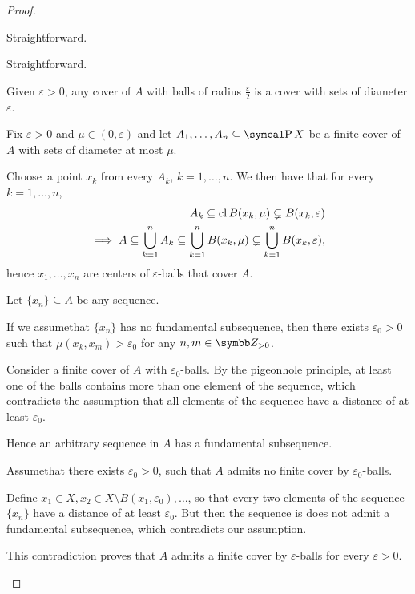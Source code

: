 \begin{proof}
  \begin{description}
     Straightforward.

     Straightforward.

     Given \( \varepsilon > 0 \), any cover of \( A \) with balls of radius \( \frac \varepsilon 2 \) is a cover with sets of diameter \( \varepsilon \).

     Fix \( \varepsilon > 0 \) and \( \mu \in (0, \varepsilon) \) and let \( A_1, \ldots, A_n \subseteq \Power X \) be a finite cover of \( A \) with sets of diameter at most \( \mu \).

    Choose\AOC~a point \( x_k \) from every \( A_k \), \( k = 1, \ldots, n \). We then have that for every \( k = 1, \ldots, n \),
    \begin{align*}
      A_k \subseteq \operatorname{cl} B(x_k, \mu) \subsetneq B(x_k, \varepsilon)
      \\
      \implies A \subseteq \bigcup_{k=1}^n A_k \subseteq \bigcup_{k=1}^n B(x_k, \mu) \subsetneq \bigcup_{k=1}^n B(x_k, \varepsilon),
    \end{align*}
    hence \( x_1, \ldots, x_n \) are centers of \( \varepsilon \)-balls that cover \( A \).

     Let \( \{ x_n \} \subseteq A \) be any sequence.

    If we assume\LEM that \( \{ x_n \} \) has no fundamental subsequence, then there exists \( \varepsilon_0 > 0 \) such that \( \mu(x_k, x_m) > \varepsilon_0 \) for any \( n, m \in \Z_{>0} \).

    Consider a finite cover of \( A \) with \( \varepsilon_0 \)-balls. By the pigeonhole principle, at least one of the balls contains more than one element of the sequence, which contradicts the assumption that all elements of the sequence have a distance of at least \( \varepsilon_0 \).

    Hence an arbitrary sequence in \( A \) has a fundamental subsequence.

     Assume\LEM that there exists \( \varepsilon_0 > 0 \), such that \( A \) admits no finite cover by \( \varepsilon_0 \)-balls.

    Define \( x_1 \in X, x_2 \in X \setminus B(x_1, \varepsilon_0), \ldots \), so that every two elements of the sequence \( \{ x_n \} \) have a distance of at least \( \varepsilon_0 \). But then the sequence is does not admit a fundamental subsequence, which contradicts our assumption.

    This contradiction proves that \( A \) admits a finite cover by \( \varepsilon \)-balls for every \( \varepsilon > 0 \).
  \end{description}
\end{proof}

